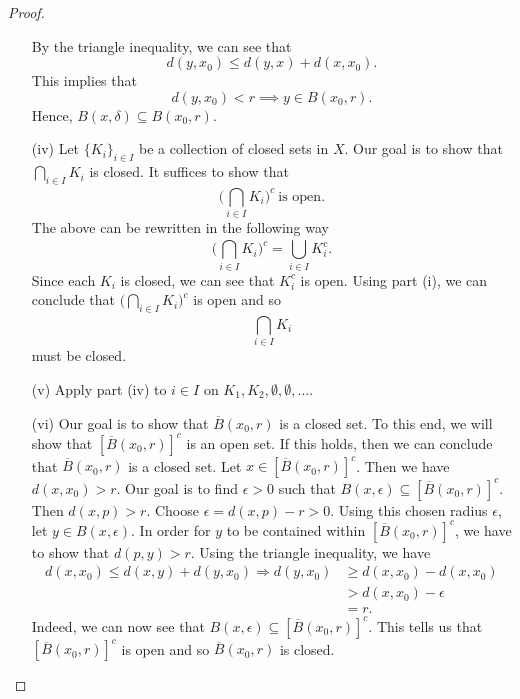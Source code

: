 \documentclass[a4paper]{article}
\begin{document}
\begin{proof}
\begin{enumerate}
        By the triangle inequality, we can see that 
        \[  d(y,{x}_{0}) \leq d(y,x) + d(x,{x}_{0}).  \]
        This implies that 
        \[  d(y,{x}_{0}) < r \implies y \in B({x}_{0},r). \]
        Hence, \( B(x,\delta) \subseteq  B({x}_{0}, r). \)
    \item[(iv)] Let \( \{ {K}_{i} \}_{i \in I} \) be a collection of closed sets in \( X  \). Our goal is to show that \( \bigcap_{  i \in I  }^{  }  {K}_{i} \) is closed. It suffices to show that 
        \[  \Big(  \bigcap_{ i \in I  }^{  }  {K}_{i} \Big)^{c} \ \text{is open}. \]
        The above can be rewritten in the following way
        \[  \Big(  \bigcap_{ i \in I }^{  }  {K}_{i} \Big)^{c} = \bigcup_{ i \in I  }^{  }  {K}_{i}^{c}. \]
        Since each \( {K}_{i}  \) is closed, we can see that \( {K}_{i}^{c} \) is open. Using part (i), we can conclude that \( \Big(  \bigcap_{ i \in I  }^{  }  {K}_{i} \Big)^{c} \) is open and so 
        \[  \bigcap_{ i \in I  }^{  }  {K}_{i} \] must be closed.
    \item[(v)] Apply part (iv) to \( i \in I \) on \( {K}_{1}, {K}_{2}, \emptyset, \emptyset, \dots  \). 
    \item[(vi)] Our goal is to show that \( \overline{B}({x}_{0}, r)\) is a closed set. To this end, we will show that \( [\overline{B}({x}_{0},r)]^{c} \) is an open set. If this holds, then we can conclude that \( \overline{B}({x}_{0},r)\) is a closed set. Let \( x \in [\overline{B}({x}_{0},r)]^{c} \). Then we have \( d(x,{x}_{0}) > r \). Our goal is to find \( \epsilon > 0  \) such that \( B(x,\epsilon) \subseteq [\overline{B}({x}_{0}, r)]^{c} \). Then \( d(x,p) > r \). Choose \( \epsilon = d(x,p) - r > 0  \). 
        Using this chosen radius \( \epsilon  \), let \( y \in B(x,\epsilon) \). In order for \( y  \) to be contained within \( [\overline{B}({x}_{0},r)]^{c} \), we have to show that \( d(p,y) > r \). Using the triangle inequality, we have 
        \begin{align*}
            d(x,{x}_{0}) \leq d(x,y) + d(y,{x}_{0}) \Longrightarrow d(y,{x}_{0}) &\geq d(x,{x}_{0}) - d(x,{x}_{0}) \\   
                                                               &> d(x,{x}_{0}) - \epsilon \tag{\( y \in B(x, \epsilon) \)} \\ 
                                                               &= r.
        \end{align*}
        Indeed, we can now see that \( B(x,\epsilon) \subseteq [\overline{B}({x}_{0},r)]^{c} \). This tells us that \( [\overline{B}({x}_{0},r)]^{c} \) is open and so \( \overline{B}({x}_{0},r) \) is closed.

\end{enumerate}
\end{proof}
\end{document}
